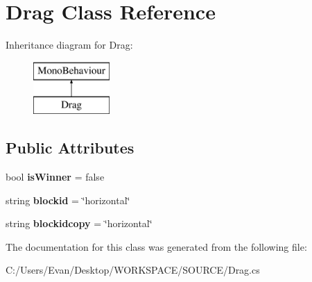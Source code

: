 \hypertarget{class_drag}{}\section{Drag Class Reference}
\label{class_drag}
Inheritance diagram for Drag\+:\begin{figure}[H]
\begin{center}
\leavevmode
\includegraphics[height=2.000000cm]{class_drag}
\end{center}
\end{figure}
\subsection*{Public Attributes}
\begin{DoxyCompactItemize}
\item 
\mbox{\label{class_drag_a966f0daaeffda7649d88764e4e88a23c}} 
bool {\bfseries is\+Winner} = false
\item 
\mbox{\label{class_drag_a72f597abbe7f2a3580bb7fd970714be4}} 
string {\bfseries blockid} = \char`\"{}horizontal\char`\"{}
\item 
\mbox{\label{class_drag_a78fb9281e9d1fda7103997409ed192dc}} 
string {\bfseries blockidcopy} = \char`\"{}horizontal\char`\"{}
\end{DoxyCompactItemize}


The documentation for this class was generated from the following file\+:\begin{DoxyCompactItemize}
\item 
C\+:/\+Users/\+Evan/\+Desktop/\+W\+O\+R\+K\+S\+P\+A\+C\+E/\+S\+O\+U\+R\+C\+E/Drag.\+cs\end{DoxyCompactItemize}
